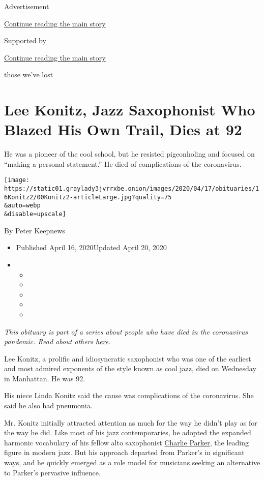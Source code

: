 Advertisement

\protect\hyperlink{after-top}{Continue reading the main story}

Supported by

\protect\hyperlink{after-sponsor}{Continue reading the main story}

those we've lost

\hypertarget{lee-konitz-jazz-saxophonist-who-blazed-his-own-trail-dies-at-92}{%
\section{Lee Konitz, Jazz Saxophonist Who Blazed His Own Trail, Dies at
92}\label{lee-konitz-jazz-saxophonist-who-blazed-his-own-trail-dies-at-92}}

He was a pioneer of the cool school, but he resisted pigeonholing and
focused on ``making a personal statement.'' He died of complications of
the coronavirus.

\texttt{[image: https://static01.graylady3jvrrxbe.onion/images/2020/04/17/obituaries/16Konitz2/00Konitz2-articleLarge.jpg?quality=75\\\&auto=webp\\\&disable=upscale]}

By Peter Keepnews

\begin{itemize}
\item
  Published April 16, 2020Updated April 20, 2020
\item
  \begin{itemize}
  \item
  \item
  \item
  \item
  \item
  \end{itemize}
\end{itemize}

\emph{This obituary is part of a series about people who have died in
the coronavirus pandemic. Read about others}
\href{https://www.nytimes3xbfgragh.onion/series/people-who-have-died-of-the-coronavirus}{\emph{here}}\emph{.}

Lee Konitz, a prolific and idiosyncratic saxophonist who was one of the
earliest and most admired exponents of the style known as cool jazz,
died on Wednesday in Manhattan. He was 92.

His niece Linda Konitz said the cause was complications of the
coronavirus. She said he also had pneumonia.

Mr. Konitz initially attracted attention as much for the way he didn't
play as for the way he did. Like most of his jazz contemporaries, he
adopted the expanded harmonic vocabulary of his fellow alto saxophonist
\href{https://www.nytimes3xbfgragh.onion/1955/03/15/archives/charlie-parker-jazz-master-dies-a-bebop-founder-and-top-saxophonist.html}{Charlie
Parker}, the leading figure in modern jazz. But his approach departed
from Parker's in significant ways, and he quickly emerged as a role
model for musicians seeking an alternative to Parker's pervasive
influence.

